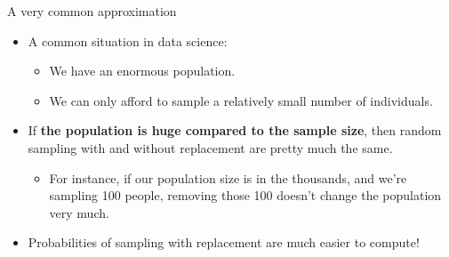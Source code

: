 \documentclass[aspectratio=169]{../latex_main/tntbeamer}  %
\begin{document}
		
	
	\begin{frame}{A very common approximation}
	    \begin{itemize}
	        \item A common situation in data science:
	        \begin{itemize}
	            \item We have an enormous population.
	            \item We can only afford to sample a relatively small number of individuals.
	        \end{itemize}
	        \item If \textbf{the population is huge compared to the sample size}, then random sampling with and without replacement are pretty much the same.
	        \begin{itemize}
	            \item For instance, if our population size is in the thousands, and we’re sampling 100 people, removing those 100 doesn’t change the population very much.
	        \end{itemize}
	        \item Probabilities of sampling with replacement are much easier to compute!
	    \end{itemize}
	\end{frame}
	
\end{document}
